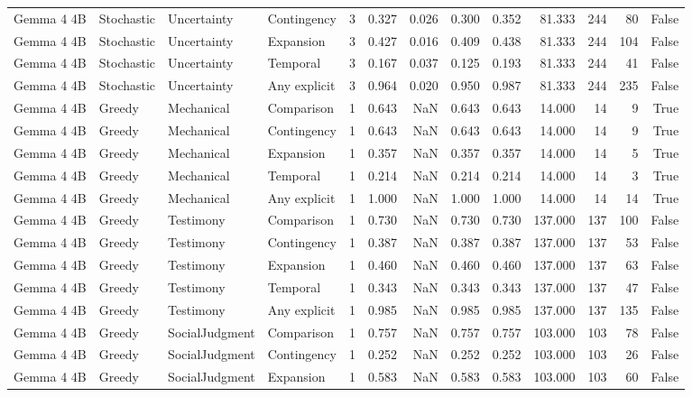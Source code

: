 \begin{tabular}{llllrrrrrrrrr}
Gemma 4 4B & Stochastic & Uncertainty & Contingency & 3 & 0.327 & 0.026 & 0.300 & 0.352 & 81.333 & 244 & 80 & False \\
Gemma 4 4B & Stochastic & Uncertainty & Expansion & 3 & 0.427 & 0.016 & 0.409 & 0.438 & 81.333 & 244 & 104 & False \\
Gemma 4 4B & Stochastic & Uncertainty & Temporal & 3 & 0.167 & 0.037 & 0.125 & 0.193 & 81.333 & 244 & 41 & False \\
Gemma 4 4B & Stochastic & Uncertainty & Any explicit & 3 & 0.964 & 0.020 & 0.950 & 0.987 & 81.333 & 244 & 235 & False \\
Gemma 4 4B & Greedy & Mechanical & Comparison & 1 & 0.643 & NaN & 0.643 & 0.643 & 14.000 & 14 & 9 & True \\
Gemma 4 4B & Greedy & Mechanical & Contingency & 1 & 0.643 & NaN & 0.643 & 0.643 & 14.000 & 14 & 9 & True \\
Gemma 4 4B & Greedy & Mechanical & Expansion & 1 & 0.357 & NaN & 0.357 & 0.357 & 14.000 & 14 & 5 & True \\
Gemma 4 4B & Greedy & Mechanical & Temporal & 1 & 0.214 & NaN & 0.214 & 0.214 & 14.000 & 14 & 3 & True \\
Gemma 4 4B & Greedy & Mechanical & Any explicit & 1 & 1.000 & NaN & 1.000 & 1.000 & 14.000 & 14 & 14 & True \\
Gemma 4 4B & Greedy & Testimony & Comparison & 1 & 0.730 & NaN & 0.730 & 0.730 & 137.000 & 137 & 100 & False \\
Gemma 4 4B & Greedy & Testimony & Contingency & 1 & 0.387 & NaN & 0.387 & 0.387 & 137.000 & 137 & 53 & False \\
Gemma 4 4B & Greedy & Testimony & Expansion & 1 & 0.460 & NaN & 0.460 & 0.460 & 137.000 & 137 & 63 & False \\
Gemma 4 4B & Greedy & Testimony & Temporal & 1 & 0.343 & NaN & 0.343 & 0.343 & 137.000 & 137 & 47 & False \\
Gemma 4 4B & Greedy & Testimony & Any explicit & 1 & 0.985 & NaN & 0.985 & 0.985 & 137.000 & 137 & 135 & False \\
Gemma 4 4B & Greedy & SocialJudgment & Comparison & 1 & 0.757 & NaN & 0.757 & 0.757 & 103.000 & 103 & 78 & False \\
Gemma 4 4B & Greedy & SocialJudgment & Contingency & 1 & 0.252 & NaN & 0.252 & 0.252 & 103.000 & 103 & 26 & False \\
Gemma 4 4B & Greedy & SocialJudgment & Expansion & 1 & 0.583 & NaN & 0.583 & 0.583 & 103.000 & 103 & 60 & False \\

\end{tabular}
